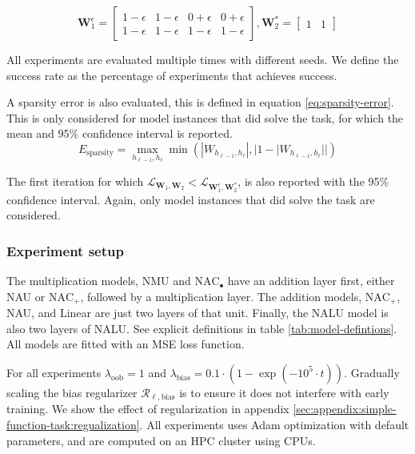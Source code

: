 \begin{equation}
    \mathbf{W}_1^\epsilon = \begin{bmatrix}
    1 - \epsilon & 1 - \epsilon & 0 + \epsilon & 0 + \epsilon \\
    1 - \epsilon & 1 - \epsilon & 1 - \epsilon & 1 - \epsilon
    \end{bmatrix}, \mathbf{W}_2^* = \begin{bmatrix}
    1 & 1
    \end{bmatrix}
    \label{eq:nearly-perfect-solution-example}
\end{equation}

All experiments are evaluated multiple times with different seeds. We define the success rate as the percentage of experiments that achieves success.

A sparsity error is also evaluated, this is defined in equation \ref{eq:sparsity-error}. This is only considered for model instances that did solve the task, for which the mean and 95\% confidence interval is reported.
\begin{equation}
E_\mathrm{sparsity} = \max_{h_{\ell-1}, h_{\ell}} \min(|W_{h_{\ell-1},h_\ell}|, |1 - |W_{h_{\ell-1},h_\ell}||)
\label{eq:sparsity-error}
\end{equation}

The first iteration for which $\mathcal{L}_{\mathbf{W}_1, \mathbf{W}_2} < \mathcal{L}_{\mathbf{W}_1^\epsilon, \mathbf{W}_2^*}$, is also reported with the 95\% confidence interval. Again, only model instances that did solve the task are considered. 

\subsubsection{Experiment setup}

The multiplication models, NMU and $\mathrm{NAC}_{\bullet}$ have an addition layer first, either NAU or $\mathrm{NAC}_{+}$, followed by a multiplication layer. The addition models, $\mathrm{NAC}_{+}$, NAU, and Linear are just two layers of that unit. Finally, the NALU model is also two layers of NALU. See explicit definitions in table \ref{tab:model-defintions}. All models are fitted with an MSE loss function.

For all experiments $\lambda_{\mathrm{oob}} = 1$ and $\lambda_{\mathrm{bias}} = 0.1 \cdot (1 - \exp(-10^5 \cdot t))$. Gradually scaling the bias regularizer $\mathcal{R}_{\ell,\mathrm{bias}}$ is to ensure it does not interfere with early training. We show the effect of regularization in appendix \ref{sec:appendix:simple-function-task:regualization}. All experiments uses Adam optimization \cite{adam-optimization} with default parameters, and are computed on an HPC cluster using  CPUs.

